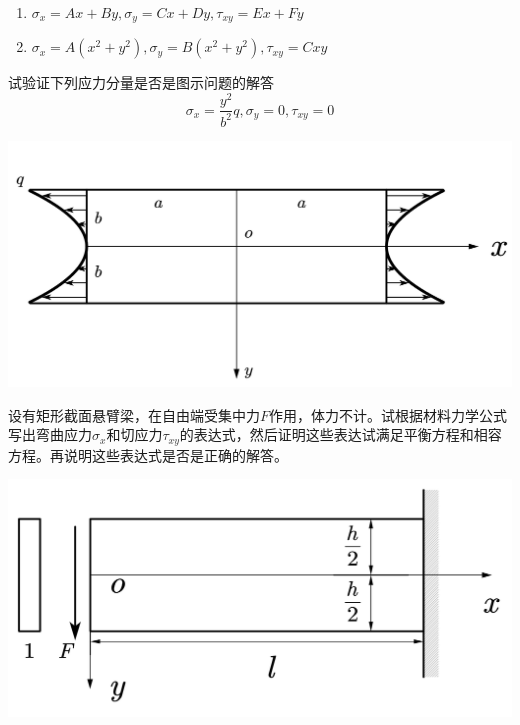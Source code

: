 \begin{example}
	\quad
	\begin{enumerate}
		\item $\sigma _x=Ax+By,\sigma _y=Cx+Dy,\tau _{xy}=Ex+Fy$
		\item $\sigma _x=A\left( x^2+y^2 \right) ,\sigma _y=B\left( x^2+y^2 \right) ,\tau _{xy}=Cxy$
	\end{enumerate}
\end{example}

\begin{example}
	试验证下列应力分量是否是图示问题的解答\[\sigma _x=\frac{y^2}{b^2}q,\sigma _y=0,\tau _{xy}=0\]
\end{example}
\centerline{\includegraphics[scale=0.5]{figure/2-4.png}}

\begin{example}
	设有矩形截面悬臂梁，在自由端受集中力$F$作用，体力不计。试根据材料力学公式写出弯曲应力$\sigma _x$和切应力$\tau _{xy}$的表达式，然后证明这些表达试满足平衡方程和相容方程。再说明这些表达式是否是正确的解答。
\end{example}
\centerline{\includegraphics[scale=0.5]{figure/2-12.png}}

